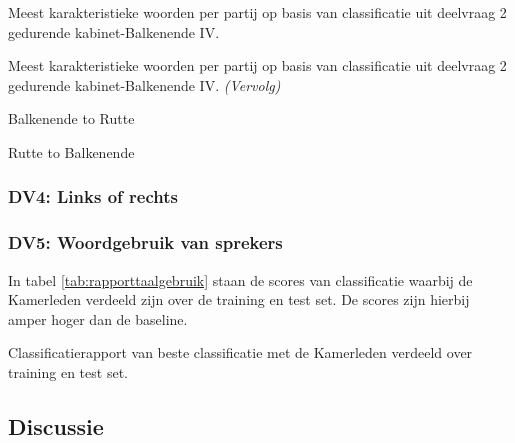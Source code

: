 \begin{table}[H] 
\caption{Meest karakteristieke woorden per partij op basis van classificatie uit deelvraag 2 gedurende kabinet-Balkenende IV.} 
\label{tab:WoordenBalkenende4} 
\centering
\hspace*{-1in}
 
\end{table} 
\addtocounter{table}{-1} 
\begin{table}[H] 
\caption{Meest karakteristieke woorden per partij op basis van classificatie uit deelvraag 2 gedurende kabinet-Balkenende IV. \emph{(Vervolg)}} 
\centering
\hspace*{-0.6in}
 
\end{table}

\begin{table}[H]
\caption{Balkenende to Rutte}
\label{tab:baltorut}
\centering

\end{table}

\begin{table}[H]
\caption{Rutte to Balkenende}
\label{tab:ruttobal}
\centering

\end{table}

\subsubsection{DV4: Links of rechts}

\subsubsection{DV5: Woordgebruik van sprekers}
In tabel \ref{tab:rapporttaalgebruik} staan de scores van classificatie waarbij de Kamerleden verdeeld zijn over de training en test set. De scores zijn hierbij amper hoger dan de baseline.
\begin{table}[H]
\caption{Classificatierapport van beste classificatie met de Kamerleden verdeeld over training en test set.}
\label{tab:rapporttaalgebruik}
\centering

\end{table}

\subsection{Discussie}
